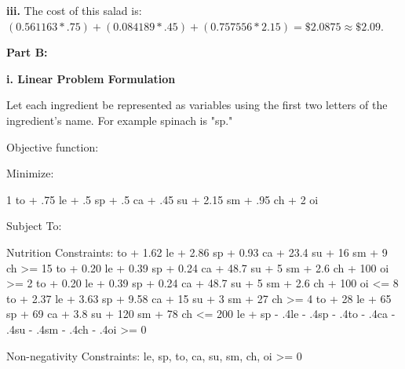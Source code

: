 \documentclass[paper=a4, fontsize=11pt]{scrartcl} %
\numberwithin{equation}{section} %
\numberwithin{figure}{section} %
\numberwithin{table}{section} %
\begin{document}
    \textbf{iii.}\newline
    The cost of this salad is: $(0.561163 * .75) + (0.084189 * .45)  + (0.757556 * 2.15) = \$2.0875 \approx \$2.09$.\newline
    
\textbf{Part B:}
    
    \textbf{i. Linear Problem Formulation}\newline
    
    Let each ingredient be represented as variables using the first two letters of the ingredient's name. For example spinach is "sp."\newline
    

    Objective function:\newline
    
    Minimize:\newline
    
    1 to + .75 le + .5 sp + .5 ca + .45 su + 2.15 sm + .95 ch + 2 oi\newline
	  
	Subject To:\newline
		
		Nutrition Constraints: to + 1.62 le + 2.86 sp + 0.93 ca + 23.4 su + 16 sm + 9 ch >= 15 to + 0.20 le + 0.39 sp + 0.24 ca + 48.7 su + 5 sm + 2.6 ch + 100 oi >= 2 to + 0.20 le + 0.39 sp + 0.24 ca + 48.7 su + 5 sm + 2.6 ch + 100 oi <= 8 to + 2.37 le + 3.63 sp + 9.58 ca + 15 su + 3 sm + 27 ch >= 4 to + 28 le + 65 sp + 69 ca + 3.8 su + 120 sm + 78 ch <= 200\newline
		   le + sp - .4le - .4sp - .4to - .4ca - .4su - .4sm - .4ch - .4oi >= 0\newline
		
		Non-negativity Constraints:\newline
		   le, sp, to, ca, su, sm, ch, oi >= 0\newline
    
\end{document}
